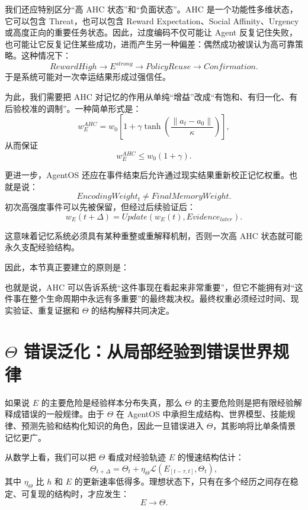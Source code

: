 我们还应特别区分“高 AHC 状态”和“负面状态”。AHC 是一个功能性多维状态，它可以包含 Threat，也可以包含 Reward Expectation、Social Affinity、Urgency 或高度正向的重要任务状态。因此，过度编码不仅可能让 Agent 反复记住失败，也可能让它反复记住某些成功，进而产生另一种偏差：偶然成功被误认为高可靠策略。这种情况下：
\[
RewardHigh
\rightarrow
E^{strong}
\rightarrow
PolicyReuse
\rightarrow
Confirmation.
\]
于是系统可能对一次幸运结果形成过强信任。

为此，我们需要把 AHC 对记忆的作用从单纯“增益”改成“有饱和、有归一化、有后验校准的调制”。一种简单形式是：
\[
w_E^{AHC}
=
w_0
\left[
1+
\gamma
\tanh\left(
\frac{\|a_t-a_0\|}{\kappa}
\right)
\right],
\]
从而保证
\[
w_E^{AHC}
\le
w_0(1+\gamma).
\]

更进一步，AgentOS 还应在事件结束后允许通过现实结果重新校正记忆权重。也就是说：
\[
EncodingWeight_t
\neq
FinalMemoryWeight.
\]
初次高强度事件可以先被保留，但经过后续验证后：
\[
w_E(t+\Delta)
=
Update
\left(
w_E(t),
Evidence_{later}
\right).
\]

这意味着记忆系统必须具有某种重整或重解释机制，否则一次高 AHC 状态就可能永久支配经验结构。

因此，本节真正要建立的原则是：
\begin{statementbox}
\centering
{}
\end{statementbox}

也就是说，AHC 可以告诉系统“这件事现在看起来非常重要”，但它不能拥有对“这件事在整个生命周期中永远有多重要”的最终裁决权。最终权重必须经过时间、现实验证、重复证据和 $\Theta$ 的结构解释共同决定。

\section{\texorpdfstring{$\Theta$}{Theta} 错误泛化：从局部经验到错误世界规律}
\label{sec:theta-misgeneralization}

如果说 $E$ 的主要危险是经验样本分布失真，那么 $\Theta$ 的主要危险则是把有限经验解释成错误的一般规律。由于 $\Theta$ 在 AgentOS 中承担生成结构、世界模型、技能规律、预测先验和结构化知识的角色，因此一旦错误进入 $\Theta$，其影响将比单条情景记忆更广。

从数学上看，我们可以把 $\Theta$ 看成对经验轨迹 $E$ 的慢速结构估计：
\[
\Theta_{t+\Delta}
=
\Theta_t
+
\eta_\Theta
\mathcal L(E_{[t-\tau,t]},\Theta_t),
\]
其中 $\eta_\Theta$ 比 $h$ 和 $E$ 的更新速率低得多。理想状态下，只有在多个经历之间存在稳定、可复现的结构时，才应发生：
\[
E\rightarrow\Theta.
\]

